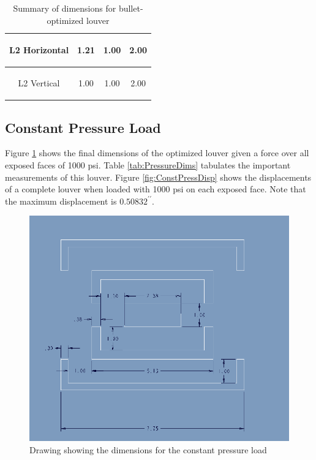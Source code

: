 \documentclass[12pt,letterpaper]{report}
\newcommand{\inchsign}{^{\prime\prime}} %
\begin{document}
\begin{table}[H]
\begin{tabular}{|c|c|c|c|}
			\hline L2 Horizontal  & 1.21 & \begin{small}
			1.00
			\end{small} & \begin{small}
			2.00
			\end{small}\\
			
			\hline L2 Vertical  & 1.00 & \begin{small}
			1.00
			\end{small} & \begin{small}
			2.00
			\end{small}\\
			
			\hline
			\end{tabular}
			\caption{Summary of dimensions for bullet-optimized louver}
			\label{tab:BulletDims}
		\end{table}
		
		\newpage
		\subsection{Constant Pressure Load}
		Figure \ref{fig:ConstantPressureDraw} shows the final dimensions of the optimized louver given a force over all exposed faces of 1000 psi.  Table \ref{tab:PressureDims} tabulates the important measurements of this louver.  Figure \ref{fig:ConstPressDisp} shows the displacements of a complete louver when loaded with 1000 psi on each exposed face.  Note that the maximum displacement is $0.50832\inchsign$.
		
		\graphicspath{ {./ScreenShots/Pressure/} }
		\begin{figure}[h]
			\centering
			\includegraphics[width=.75\textwidth]{PressureAssyDraw}
			\caption{Drawing showing the dimensions for the constant pressure load}
			\label{fig:ConstantPressureDraw}
		\end{figure}
		
\end{document}
